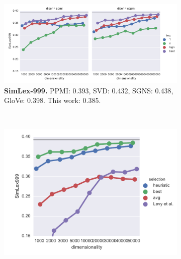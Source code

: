 \begin{figure}
  \centering
  \begin{subfigure}[t]{0.6\textwidth}
    \includegraphics[width=\textwidth]{supplement/figures/SimLex999-best}
    \caption{\small \textbf{SimLex-999.}
      PPMI: 0.393,
      SVD: 0.432,
      SGNS: 0.438,
      GloVe: 0.398.
      This work: 0.385.
    }
    \label{fig:best-simlex}
  \end{subfigure}
  ~
  \begin{subfigure}[t]{0.37\textwidth}
    \includegraphics[width=\textwidth]{supplement/figures/SimLex999-global-best}
    \caption{}
    \label{fig:global-best-simlex}
  \end{subfigure}


\end{figure}
